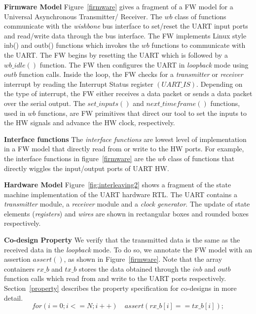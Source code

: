 \documentclass[sigconf]{acmart}
\begin{document}
\textbf{Firmware Model} Figure~\ref{firmware} gives a fragment of a FW model for a Universal 
Asynchronous Transmitter/ Receiver.  The
$wb$ class of functions communicate with the {\em wishbone} bus interface to
set/reset the UART input ports and read/write data through the bus
interface.  The FW implements Linux style inb() and outb() functions which
invokes the $wb$ functions to communicate with the UART.  The FW begins 
by resetting the UART  which is followed by a $wb\_idle()$ function.  The 
FW then configures the UART in {\em loopback} mode using $outb$ function calls. 
Inside the loop, the FW checks for a {\em transmitter} or {\em
receiver} interrupt by reading the Interrupt Status register $(UART\_IS)$. 
Depending on the type of interrupt, the FW either receives a data packet 
or sends a data packet over the serial output.  The $set\_inputs()$ and
$next\_timeframe()$ functions, used in $wb$ functions, are 
FW primitives that direct our tool to set the inputs to the HW signals 
and advance the HW clock, respectively.

\textbf{Interface functions} The \emph{interface functions} are lowest level of 
implementation in a FW model that directly read from or write to the HW ports. 
For example, the interface functions in figure~\ref{firmware} are the $wb$ class
of functions that directly wiggles the input/output ports of UART HW.


\textbf{Hardware Model} Figure~\ref{fig:interleaving2} shows a fragment of the state machine 
implementation of the UART hardware RTL.  The UART  contains a
\emph{transmitter} module, a \emph{receiver} module and a \emph{clock
generator}.  The update of state elements (\emph{registers}) and 
\emph{wires} are shown in rectangular boxes and rounded boxes respectively.  

\textbf{Co-design Property} We verify that the transmitted data is the same as the 
received data in the {\em loopback} mode.  To do so, we annotate the FW model 
with an assertion $assert()$, as shown in Figure~\ref{firmware}.  Note that the 
array containers $rx\_b$ and $tx\_b$ stores the data obtained through the $inb$
and $outb$ function calls which read from and write to the UART  ports
respectively. Section~\ref{property} describes the property specification for 
co-designs in more detail. 
\[
  for(i=0; i<=N; i++) 
   \quad assert(rx\_b[i] == tx\_b[i]);
\]
%
\end{document}
